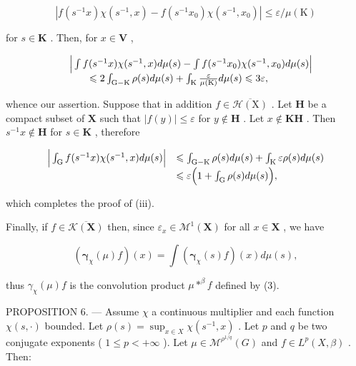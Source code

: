 \[
\left| f \left(s ^ {- 1} x\right) \chi \left(s ^ {- 1}, x\right) - f \left(s ^ {- 1} x _ {0}\right) \chi \left(s ^ {- 1}, x _ {0}\right) \right| \leqslant \varepsilon / \mu (\mathrm{K})
\]

for \(s \in \mathbf{K}\) . Then, for \(x \in \mathbf{V}\) ,

\[
\begin{array}{r l} & {\Big | \int f (s ^ {- 1} x) \chi (s ^ {- 1}, x) d \mu (s) - \int f (s ^ {- 1} x _ {0}) \chi (s ^ {- 1}, x _ {0}) d \mu (s) \Big |} \\ & {\qquad \leqslant 2 \int_ {\mathrm{G-K}} \rho (s) d \mu (s) + \int_ {\mathrm{K}} \frac {\varepsilon}{\mu (\mathrm{K})} d \mu (s) \leqslant 3 \varepsilon ,} \end{array}
\]

whence our assertion. Suppose that in addition \(f \in \overline{\mathcal{H}(\mathrm{X})}\) . Let \(\mathbf{H}\) be a compact subset of \(\mathbf{X}\) such that \(|f(y)| \leqslant \varepsilon\) for \(y \notin \mathbf{H}\) . Let \(x \notin \mathbf{KH}\) . Then \(s^{-1}x \notin \mathbf{H}\) for \(s \in \mathbf{K}\) , therefore

\[
\begin{array}{r l} \Big | \int_ {\mathrm{G}} f (s ^ {- 1} x) \chi (s ^ {- 1}, x) d \mu (s) \Big | & \leqslant \int_ {\mathrm{G} - \mathrm{K}} \rho (s) d \mu (s) + \int_ {\mathrm{K}} \varepsilon \rho (s) d \mu (s) \\ & \leqslant \varepsilon \Big (1 + \int_ {\mathrm{G}} \rho (s) d \mu (s) \Big), \end{array}
\]

which completes the proof of (iii).

Finally, if \(f \in \overline{\mathcal{K}(\mathbf{X})}\) then, since \(\varepsilon_x \in \mathcal{M}^1(\mathbf{X})\) for all \(x \in \mathbf{X}\) , we have

\[
\left(\boldsymbol {\gamma} _ {\chi} (\mu) f\right) (x) = \int \left(\boldsymbol {\gamma} _ {\chi} (s) f\right) (x) d \mu (s),
\]

thus \(\gamma_{\chi}(\mu)f\) is the convolution product \(\mu *^{\beta}f\) defined by (3).

PROPOSITION 6. --- Assume \(\chi\) a continuous multiplier and each function \(\chi(s, \cdot)\) bounded. Let \(\rho(s) = \sup_{x \in X} \chi(s^{-1}, x)\) . Let \(p\) and \(q\) be two conjugate exponents ( \(1 \leqslant p < +\infty\) ). Let \(\mu \in \mathcal{M}^{\rho^{1/q}}(G)\) and \(f \in L^{p}(X, \beta)\) . Then:

